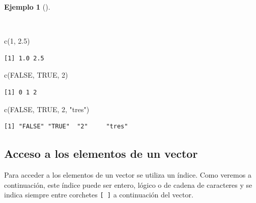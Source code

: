 \documentclass[
  a4paper,
]{scrreport}
\newenvironment{Shaded}{\begin{snugshade}}{\end{snugshade}}
\newcommand{\ConstantTok}[1]{\textcolor[rgb]{0.56,0.35,0.01}{#1}}
\newcommand{\DecValTok}[1]{\textcolor[rgb]{0.68,0.00,0.00}{#1}}
\newcommand{\FloatTok}[1]{\textcolor[rgb]{0.68,0.00,0.00}{#1}}
\newcommand{\FunctionTok}[1]{\textcolor[rgb]{0.28,0.35,0.67}{#1}}
\newcommand{\NormalTok}[1]{\textcolor[rgb]{0.00,0.23,0.31}{#1}}
\newcommand{\StringTok}[1]{\textcolor[rgb]{0.13,0.47,0.30}{#1}}
\theoremstyle{definition}
\theoremstyle{definition}
\newtheorem{example}{Ejemplo}[chapter]
\theoremstyle{remark}
\begin{document}
\begin{example}[]\protect\hypertarget{exm-coercion}{}\label{exm-coercion}

~

\begin{Shaded}
\begin{Highlighting}[]
\FunctionTok{c}\NormalTok{(}\DecValTok{1}\NormalTok{, }\FloatTok{2.5}\NormalTok{)}
\end{Highlighting}
\end{Shaded}

\begin{verbatim}
[1] 1.0 2.5
\end{verbatim}

\begin{Shaded}
\begin{Highlighting}[]
\FunctionTok{c}\NormalTok{(}\ConstantTok{FALSE}\NormalTok{, }\ConstantTok{TRUE}\NormalTok{, }\DecValTok{2}\NormalTok{)}
\end{Highlighting}
\end{Shaded}

\begin{verbatim}
[1] 0 1 2
\end{verbatim}

\begin{Shaded}
\begin{Highlighting}[]
\FunctionTok{c}\NormalTok{(}\ConstantTok{FALSE}\NormalTok{, }\ConstantTok{TRUE}\NormalTok{, }\DecValTok{2}\NormalTok{, }\StringTok{"tres"}\NormalTok{)}
\end{Highlighting}
\end{Shaded}

\begin{verbatim}
[1] "FALSE" "TRUE"  "2"     "tres" 
\end{verbatim}

\end{example}

\hypertarget{acceso-a-los-elementos-de-un-vector}{%
\subsection{Acceso a los elementos de un
vector}\label{acceso-a-los-elementos-de-un-vector}}

Para acceder a los elementos de un vector se utiliza un índice. Como
veremos a continuación, este índice puede ser entero, lógico o de cadena
de caracteres y se indica siempre entre corchetes \texttt{{[}\ {]}} a
continuación del vector.
\end{document}
